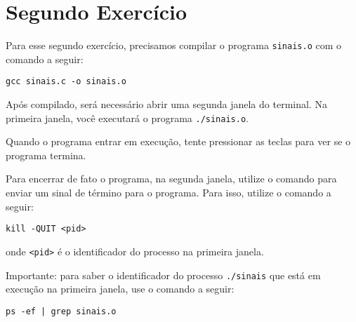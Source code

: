 

\section{Segundo Exercício}
 
 Para esse segundo exercício, precisamos compilar o programa \texttt{sinais.o} com o comando a seguir:
 
\begin{lstlisting}[style=MyBashStyle]
gcc sinais.c -o sinais.o 
\end{lstlisting}

Após compilado, será necessário abrir uma segunda janela do terminal. Na primeira janela, você executará o programa \texttt{./sinais.o}. 

Quando o programa entrar em execução, tente pressionar as teclas  para ver se o programa termina.

Para encerrar de fato o programa, na segunda janela, utilize o comando  para enviar um sinal de término para o programa. Para isso, utilize o comando a seguir:

\begin{lstlisting}[style=MyBashStyle]
kill -QUIT <pid>
\end{lstlisting}

\noindent onde \texttt{<pid>} é o identificador do processo na primeira janela.

Importante: para saber o identificador do processo \texttt{./sinais} que está em execução na primeira janela, use o comando a seguir:

\begin{lstlisting}[style=MyBashStyle]
ps -ef | grep sinais.o
\end{lstlisting}
